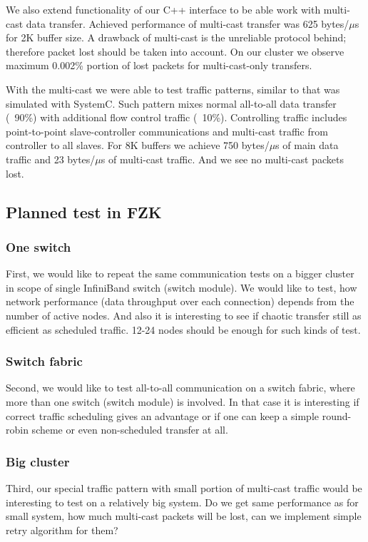 We also extend functionality of our C++ interface to be able work with multi-cast data transfer.
Achieved performance of multi-cast transfer was 625 bytes/$\mu$s for 2K buffer size.
A drawback of multi-cast is the unreliable protocol behind; therefore packet lost should be taken into account.
On our cluster we observe maximum 0.002\% portion of lost packets for multi-cast-only transfers.

With the multi-cast we were able to test traffic patterns, similar to that was simulated with SystemC.
Such pattern mixes normal all-to-all data transfer (~90\%) with additional flow control traffic (~10\%).
Controlling traffic includes point-to-point slave-controller communications and multi-cast traffic
from controller to all slaves.
For 8K buffers we achieve 750 bytes/$\mu$s of main data traffic and 23 bytes/$\mu$s of multi-cast traffic.
And we see no multi-cast packets lost.


\subsection{Planned test in FZK}
\subsubsection{One switch}
First, we would like to repeat the same communication tests on a bigger cluster
in scope of single InfiniBand switch (switch module). We would like to test,
how network performance (data throughput over each connection) depends from
the number of active nodes. And also it is interesting to see if chaotic transfer
still as efficient as scheduled traffic. 12-24 nodes should be enough for such kinds of test.
\subsubsection{Switch fabric}
Second, we would like to test all-to-all communication on a switch fabric,
where more than one switch (switch module) is involved. In that case it is interesting
if correct traffic scheduling gives an advantage or if one can keep a simple round-robin
scheme or even non-scheduled transfer at all.
\subsubsection{Big cluster}
Third, our special traffic pattern with small portion of multi-cast traffic
would be interesting to test on a relatively big system. Do we get same
performance as for small system, how much multi-cast packets will be lost,
can we implement simple retry algorithm for them?


